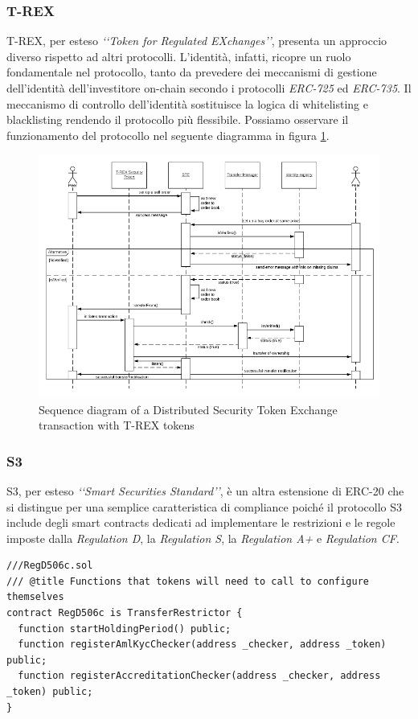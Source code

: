 \subsubsection{T-REX}
T-REX, per esteso \textit{‘‘Token for Regulated EXchanges’’}, presenta un approccio diverso rispetto ad altri protocolli. L'identità, infatti, ricopre un ruolo fondamentale nel protocollo, tanto da prevedere dei meccanismi di gestione dell'identità dell'investitore on-chain secondo i protocolli \textit{ERC-725} ed \textit{ERC-735}. Il meccanismo di controllo dell'identità sostituisce la logica di whitelisting e blacklisting rendendo il protocollo più flessibile. Possiamo osservare il funzionamento del protocollo nel seguente diagramma in figura \ref{fig:trex}.
\begin{figure}[H]
  \includegraphics[width=\linewidth]{trex.png}
  \caption{Sequence diagram of a Distributed Security Token Exchange  transaction with T-REX tokens}
  \label{fig:trex}
\end{figure}
\subsubsection{S3}
S3, per esteso \textit{‘‘Smart Securities Standard’’}, è un altra estensione di ERC-20 che si distingue per una semplice caratteristica di compliance poiché il protocollo S3 include degli smart contracts dedicati ad implementare le restrizioni e le regole imposte dalla \textit{Regulation D}, la \textit{Regulation S}, la \textit{Regulation A+} e \textit{Regulation CF}.

\begin{lstlisting}[language=Solidity,numbers=none]
///RegD506c.sol
/// @title Functions that tokens will need to call to configure themselves 
contract RegD506c is TransferRestrictor {
  function startHoldingPeriod() public;
  function registerAmlKycChecker(address _checker, address _token) public;
  function registerAccreditationChecker(address _checker, address _token) public;
}
\end{lstlisting}

